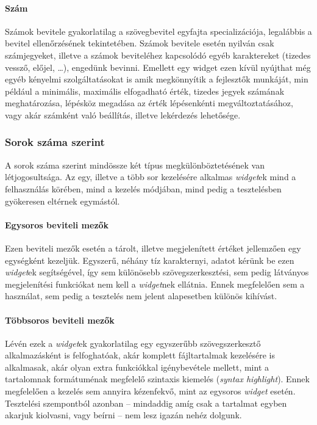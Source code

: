 \paragraph{Szám}

Számok bevitele gyakorlatilag a szövegbevitel egyfajta specializációja, legalábbis a bevitel ellenőrzésének tekintetében. Számok bevitele esetén nyilván csak számjegyeket, illetve a számok beviteléhez kapcsolódó egyéb karaktereket (tizedes vessző, előjel, \dots), engedünk bevinni. Emellett egy widget ezen kívül nyújthat még egyéb kényelmi szolgáltatásokat is amik megkönnyítik a fejlesztők munkáját, min például a minimális, maximális elfogadható érték, tizedes jegyek számának meghatározása, lépésköz megadása az érték lépésenkénti megváltoztatásához, vagy akár számként való beállítás, illetve lekérdezés lehetősége.

\subsubsection{Sorok száma szerint}

A sorok száma szerint mindössze két típus megkülönböztetésének van létjogosultsága. Az egy, illetve a több sor kezelésére alkalmas \textit{widget}ek mind a felhasználás körében, mind a kezelés módjában, mind pedig a tesztelésben gyökeresen eltérnek egymástól.

\paragraph{Egysoros beviteli mezők}

Ezen beviteli mezők esetén a tárolt, illetve megjelenített értéket jellemzően egy egységként kezeljük. Egyszerű, néhány tíz karakternyi, adatot kérünk be ezen \textit{widget}ek segítségével, így sem különösebb szövegszerkesztési, sem pedig látványos megjelenítési funkciókat nem kell a \textit{widget}nek ellátnia. Ennek megfelelően sem a használat, sem pedig a tesztelés nem jelent alapesetben különös kihívást.

\paragraph{Többsoros beviteli mezők}

Lévén ezek a \textit{widget}ek gyakorlatilag egy egyszerűbb szövegszerkesztő alkalmazásként is felfoghatóak, akár komplett fájltartalmak kezelésére is alkalmasak, akár olyan extra funkciókkal igénybevétele mellett, mint a tartalomnak formátuménak megfelelő szintaxis kiemelés (\textit{syntax highlight}). Ennek megfelelően a kezelés sem annyira kézenfekvő, mint az egysoros \textit{widget} esetén. Tesztelési szempontból azonban -- mindaddig amíg csak a tartalmat egyben akarjuk kiolvasni, vagy beírni -- nem lesz igazán nehéz dolgunk.

